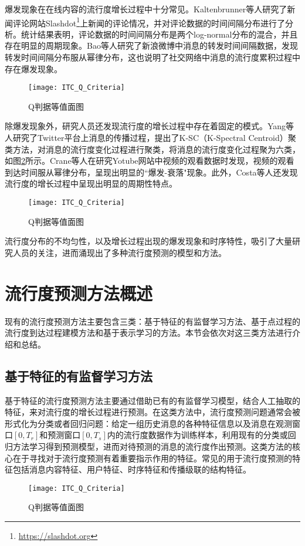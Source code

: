 爆发现象在在线内容的流行度增长过程中十分常见。Kaltenbrunner等人\citep{kaltenbrunner2007description}研究了新闻评论网站Slashdot\footnote{\url{https://slashdot.org}}上新闻的评论情况，并对评论数据的时间间隔分布进行了分析。统计结果表明，评论数据的时间间隔分布是两个log-normal分布的混合，并且存在明显的周期现象。Bao等人\citep{bao2013cumulative}研究了新浪微博中消息的转发时间间隔数据，发现转发时间间隔分布服从幂律分布，这也说明了社交网络中消息的流行度累积过程中存在爆发现象。
\begin{figure}[!htbp]
  \centering
  \texttt{[image: ITC\_Q\_Criteria]}
  \caption{Q判据等值面图}
  \label{fig:burst}
\end{figure}

除爆发现象外，研究人员还发现流行度的增长过程中存在着固定的模式。Yang等人\citep{yang2011patterns}研究了Twitter平台上消息的传播过程，提出了K-SC（K-Spectral Centroid）聚类方法，对消息的流行度变化过程进行聚类，将消息的流行度变化过程聚为六类，如图\ref{fig:pattern}所示。Crane等人\citep{crane2008robust}在研究Yotube网站中视频的观看数据时发现，视频的观看到达时间服从幂律分布，呈现出明显的``爆发-衰落"现象。此外，Costa等人\citep{ferraz2015rsc}还发现流行度的增长过程中呈现出明显的周期性特点。
\begin{figure}[!htbp]
  \centering
  \texttt{[image: ITC\_Q\_Criteria]}
  \caption{Q判据等值面图}
  \label{fig:pattern}
\end{figure}

流行度分布的不均匀性，以及增长过程出现的爆发现象和时序特性，吸引了大量研究人员的关注，进而涌现出了多种流行度预测的模型和方法。
\section{流行度预测方法概述}
现有的流行度预测方法主要包含三类：基于特征的有监督学习方法、基于点过程的流行度到达过程建模方法和基于表示学习的方法。本节会依次对这三类方法进行介绍和总结。
\subsection{基于特征的有监督学习方法}
基于特征的流行度预测方法主要通过借助已有的有监督学习模型，结合人工抽取的特征，来对流行度的增长过程进行预测。在这类方法中，流行度预测问题通常会被形式化为分类或者回归问题：给定一组历史消息的各种特征信息以及消息在观测窗口$[0,T_r]$和预测窗口$[0,T_s]$内的流行度数据作为训练样本，利用现有的分类或回归方法学习得到预测模型，进而对待预测的消息的流行度作出预测。这类方法的核心在于寻找对于流行度预测有着重要指示作用的特征。常见的用于流行度预测的特征包括消息内容特征、用户特征、时序特征和传播级联的结构特征。
\begin{figure}[!htbp]
  \centering
  \texttt{[image: ITC\_Q\_Criteria]}
  \caption{Q判据等值面图}
  \label{fig:loglinear}
\end{figure}

